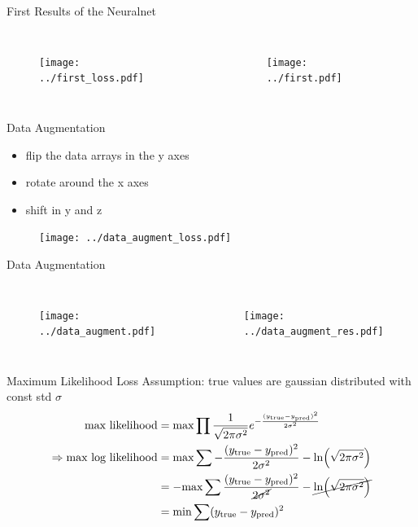 \documentclass[10pt]{beamer}
\begin{document}
\begin{frame}{First Results of the Neuralnet}
  \begin{columns}
    \begin{figure}[htp]
      \texttt{[image: ../first\_loss.pdf]}
    \end{figure}
    \begin{figure}[htp]
      \texttt{[image: ../first.pdf]}
    \end{figure}
  \end{columns}
\end{frame}

\begin{frame}{Data Augmentation}
  \begin{itemize}
  \item flip the data arrays in the y axes
  \item rotate around the x axes
  \item shift in y and z
  \end{itemize}
    \begin{figure}[htp]
      \texttt{[image: ../data\_augment\_loss.pdf]}
    \end{figure}
\end{frame}


\begin{frame}{Data Augmentation}
  \begin{columns}
    \begin{figure}[htp]
      \texttt{[image: ../data\_augment.pdf]}
    \end{figure}
    \begin{figure}[htp]
      \texttt{[image: ../data\_augment\_res.pdf]}
    \end{figure}
  \end{columns}
\end{frame}

\begin{frame}{Maximum Likelihood Loss}
Assumption: true values are gaussian distributed with const std $\sigma$
  \begin{align*}
    \text{max likelihood} &= \text{max} \prod \frac{1}{\sqrt{2\pi \sigma^2}} e^{-\frac{(y_{\text{true}}-y_{\text{pred}})^2}{2 \sigma^2}}                          \\
    \Rightarrow \text{max log likelihood} & =\text{max} \sum -\frac{(y_{\text{true}}-y_{\text{pred}})^2}{2 \sigma^2} - \ln(\sqrt{2\pi \sigma^2})                  \\
                                          & =-\text{max} \sum\frac{(y_{\text{true}}-y_{\text{pred}})^2}{\cancel{2 \sigma^2}} - \cancel{\ln(\sqrt{2\pi \sigma^2})} \\
                                          & = \text{min} \sum (y_{\text{true}}-y_{\text{pred}})^2
  \end{align*}
\end{frame}
\end{document}
